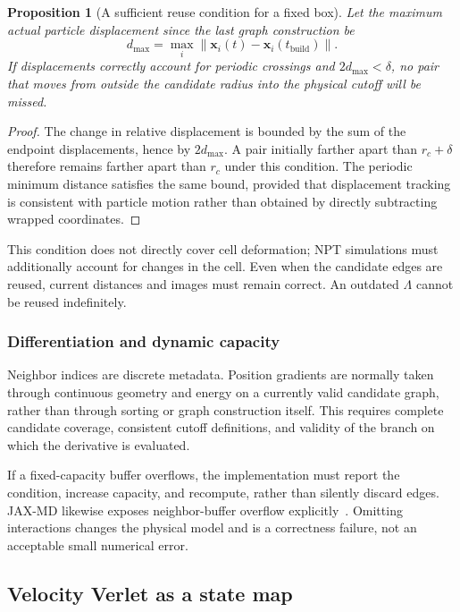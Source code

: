 \documentclass[11pt,a4paper]{article}
\newcommand{\norm}[1]{\left\lVert #1\right\rVert}
\newcommand{\vect}[1]{\bm{#1}}
\newtheorem{proposition}{Proposition}[section]
\theoremstyle{definition}
\begin{document}
\begin{proposition}[A sufficient reuse condition for a fixed box]
Let the maximum actual particle displacement since the last graph construction be
\begin{equation}
d_{\max}=\max_i\norm{\vect x_i(t)-\vect x_i(t_{\mathrm{build}})}.
\end{equation}
If displacements correctly account for periodic crossings and $2d_{\max}<\delta$, no pair that
moves from outside the candidate radius into the physical cutoff will be missed.
\end{proposition}
\begin{proof}
The change in relative displacement is bounded by the sum of the endpoint displacements, hence
by $2d_{\max}$. A pair initially farther apart than $r_c+\delta$ therefore remains farther apart
than $r_c$ under this condition. The periodic minimum distance satisfies the same bound,
provided that displacement tracking is consistent with particle motion rather than obtained by
directly subtracting wrapped coordinates.
\end{proof}
This condition does not directly cover cell deformation; NPT simulations must additionally
account for changes in the cell. Even when the candidate edges are reused, current distances and
images must remain correct. An outdated $\Lambda$ cannot be reused indefinitely.

\subsubsection{Differentiation and dynamic capacity}
Neighbor indices are discrete metadata. Position gradients are normally taken through continuous
geometry and energy on a currently valid candidate graph, rather than through sorting or graph
construction itself. This requires complete candidate coverage, consistent cutoff definitions,
and validity of the branch on which the derivative is evaluated.

If a fixed-capacity buffer overflows, the implementation must report the condition, increase
capacity, and recompute, rather than silently discard edges. JAX-MD likewise exposes
neighbor-buffer overflow explicitly~\cite{jax-neighbor}. Omitting interactions changes the
physical model and is a correctness failure, not an acceptable small numerical error.
\subsection{Velocity Verlet as a state map}
\label{sec:verlet}
\end{document}
